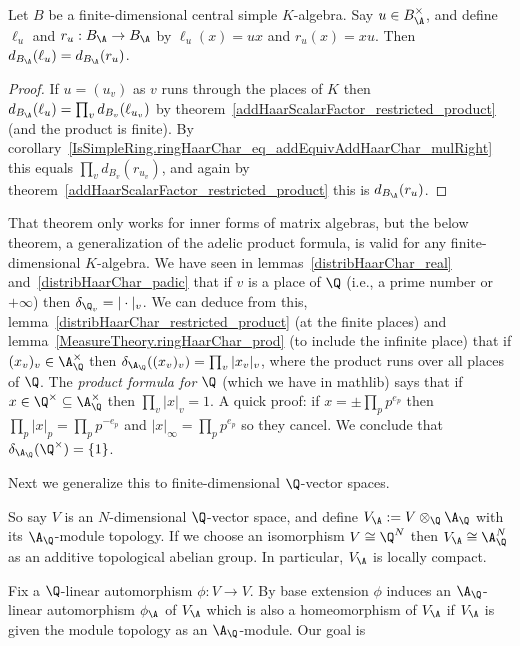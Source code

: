 \begin{theorem}
  \label{addHaarScalarFactor.left_mul_eq_right_mul}
  Let $B$ be a finite-dimensional central simple $K$-algebra.
  Say $u\in B_{\A}^\times$, and define $\ell_u$ and $r_u:B_{\A}\to B_{\A}$ by
  $\ell_u(x)=ux$ and $r_u(x)=xu$. Then $d_{B_{\A}}(\ell_u)=d_{B_{\A}}(r_u)$.
\end{theorem}
\begin{proof} If $u=(u_v)$ as $v$ runs through the places of $K$ then
  $d_{B_{\A}}(\ell_u)=\prod_v d_{B_v}(\ell_{u_v})$ by
  theorem~\ref{addHaarScalarFactor_restricted_product} (and the product is finite).
  By corollary~\ref{IsSimpleRing.ringHaarChar_eq_addEquivAddHaarChar_mulRight}
  this equals $\prod_v d_{B_v}(r_{u_v})$, and again by
  theorem~\ref{addHaarScalarFactor_restricted_product} this is $d_{B_{\A}}(r_u)$.
\end{proof}

That theorem only works for inner forms of matrix algebras, but the below theorem,
a generalization of the adelic product formula, is valid for any finite-dimensional
$K$-algebra.
We have seen in lemmas~\ref{distribHaarChar_real} and~\ref{distribHaarChar_padic}
  that if $v$ is a place of $\Q$ (i.e., a prime
  number or $+\infty$) then $\delta_{\Q_v}=|\cdot|_v$.
  We can deduce from this, lemma~\ref{distribHaarChar_restricted_product} (at the finite places)
  and lemma~\ref{MeasureTheory.ringHaarChar_prod} (to include the infinite place) that if $(x_v)_v\in\A_{\Q}^\times$
  then $\delta_{\A_{\Q}}((x_v)_v)=\prod_v|x_v|_v$, where the product
  runs over all places of $\Q$.
  The \emph{product formula for $\Q$} (which we have in mathlib) says
  that if $x\in\Q^\times\subseteq\A_{\Q}^\times$ then $\prod_v|x|_v=1.$
  A quick proof: if $x=\pm\prod_pp^{e_p}$ then $\prod_p|x|_p=\prod_pp^{-e_p}$
  and $|x|_\infty=\prod_pp^{e_p}$ so they cancel. We conclude that $\delta_{\A_{\Q}}(\Q^\times)=\{1\}$.

  Next we generalize this to finite-dimensional $\Q$-vector spaces.

  So say $V$ is an $N$-dimensional $\Q$-vector space,
  and define $V_{\A}:= V\otimes_{\Q}\A_{\Q}$ with its $\A_{\Q}$-module topology.
  If we choose an isomorphism $V\cong\Q^N$ then $V_{\A}\cong\A_{\Q}^N$
  as an additive topological abelian group. In particular, $V_{\A}$ is locally compact.

  Fix a $\Q$-linear automorphism $\phi:V\to V$. By base extension $\phi$ induces
  an $\A_{\Q}$-linear automorphism $\phi_{\A}$ of $V_{\A}$ which is also a homeomorphism of $V_{\A}$
  if $V_{\A}$ is given the module topology as an $\A_{\Q}$-module. Our goal is

